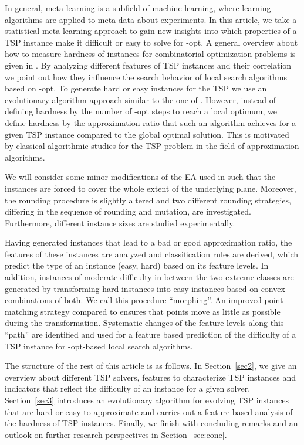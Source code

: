 \documentclass{article}
\begin{document}
In general, meta-learning is a subfield of machine learning, where
learning algorithms are applied to meta-data about experiments.  In
this article, we take a statistical meta-learning approach to gain new
insights into which properties of a TSP instance make it difficult or
easy to solve for -opt. A general overview about how to measure
hardness of instances for combinatorial optimization problems is given
in \cite{SML12}. By analyzing different features of TSP instances and
their correlation we point out how they influence the search behavior
of local search algorithms based on -opt. To generate hard or easy
instances for the TSP we use an evolutionary algorithm approach
similar to the one of \cite{SMHL10}. However, instead of defining
hardness by the number of -opt steps to reach a local optimum, we
define hardness by the approximation ratio that such an algorithm
achieves for a given TSP instance compared to the global optimal
solution. This is motivated by classical algorithmic studies for the
TSP problem in the field of approximation algorithms.

We will consider some minor modifications of the EA used in
\cite{mersmann2012} such that the instances are forced to cover the
whole extent of the underlying plane. Moreover, the rounding procedure
is slightly altered and two different rounding strategies, differing
in the sequence of rounding and mutation, are
investigated. Furthermore, different instance sizes are studied
experimentally.

Having generated instances that lead to a bad or good approximation
ratio, the features of these instances are analyzed and classification
rules are derived, which predict the type of an instance (easy, hard)
based on its feature levels. In addition, instances of moderate
difficulty in between the two extreme classes are generated by
transforming hard instances into easy instances based on convex
combinations of both. We call this procedure
``morphing''. An improved point matching strategy compared to
\cite{mersmann2012} ensures that points move as little as possible
during the transformation. Systematic changes of the feature levels
along this ``path'' are identified and used for a feature based
prediction of the difficulty of a TSP instance for -opt-based local
search algorithms.

The structure of the rest of this article is as follows. In
Section~\ref{sec2}, we give an overview about different TSP solvers,
features to characterize TSP instances and indicators that reflect the
difficulty of an instance for a given solver. Section~\ref{sec3}
introduces an evolutionary algorithm for evolving TSP instances that
are hard or easy to approximate and carries out a feature based
analysis of the hardness of TSP instances. Finally, we finish with
concluding remarks and an outlook on further research perspectives in
Section~\ref{sec:conc}.
\end{document}
